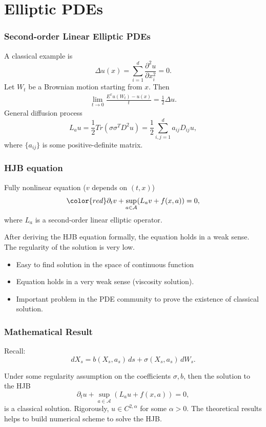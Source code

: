\documentclass{beamer}
\begin{document}
\section{Elliptic PDEs}
\begin{frame}
\frametitle{Second-order Linear Elliptic PDEs}
A classical example is 
\begin{equation*}
\Delta u(x) = \sum_{i=1}^d\frac{\partial^2 u}{\partial x_i^2}= 0.
\end{equation*}
Let $W_t$ be a Brownian motion starting from $x$. Then 
\begin{align*}
\lim_{t\to 0}\frac{E^xu(W_t)-u(x)}{t} = \frac{1}{2}\Delta u.%
\end{align*}
General diffusion process
$$L_a u = \frac{1}{2}Tr(\sigma \sigma^T D^2 u) = \frac{1}{2}\sum_{i,j=1}^da_{ij}D_{ij}u,$$ 
where $\{a_{ij}\}$ is some positive-definite matrix.

\end{frame}
\begin{frame}
\frametitle{HJB equation}
Fully nonlinear equation ({\color{red}$v$ depends on $(t,x)$})
\begin{equation*}
{\color{red}\partial_t v} + \sup_{a\in \mathcal{A}}(L_a v +f(x,a)) = 0,
\end{equation*}
where $L_a$ is a second-order linear elliptic operator. 

\vfill
After deriving the HJB equation formally,  the equation holds in a weak sense. The regularity of the solution is very low. 
\begin{itemize}
\item Easy to find solution in the space of continuous function 
\item Equation holds in a very weak sense (viscosity solution).
\item Important problem in the PDE community to prove the existence of classical solution.
\end{itemize}
\end{frame}

\begin{frame}

\frametitle{Mathematical Result}
Recall:
$$
dX_s = b(X_s,a_s)\,ds + \sigma(X_s,a_s)\,dW_s.
$$

Under some regularity assumption on the coefficients $\sigma,b$, then the solution to the HJB
$$
{\partial_t u} + \sup_{a\in \mathcal{A}}(L_a u +f(x,a)) = 0,
$$
is a classical solution. Rigorously, $u\in C^{2,\alpha}$ for some $\alpha>0$. 
\vfill
The theoretical results helps to build numerical scheme to solve the HJB.
\end{frame}
\end{document}
